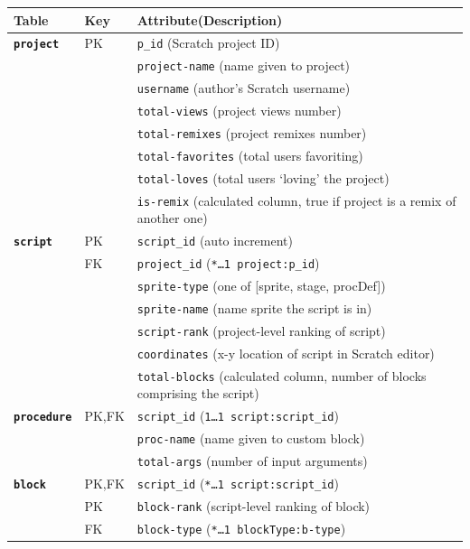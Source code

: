 \documentclass[10pt, conference]{IEEEtran}
\begin{document}
\begin{table}[ht]
	\centering
	\begin{tabular}{llp{5.4cm}}
		\textbf{Table}& \textbf{Key} & \textbf{Attribute(Description)}\\
		\hline
		\textbf{\texttt{project}} & PK & \texttt{p\_id} (Scratch project ID)\\
		&  & 							\texttt{project-name} (name given to project)\\
		&  & 							\texttt{username} (author's Scratch 
		username)\\
		&  & 							\texttt{total-views} (project views number)\\
		&  & 							\texttt{total-remixes} (project remixes number)\\
		&  & 							\texttt{total-favorites} (total users favoriting)\\
		&  & 							\texttt{total-loves} (total users `loving' the project)\\
		& & 							\texttt{is-remix} (calculated column, true if project is a remix of another one)\\
		\hline
		\textbf{\texttt{script}} & PK & \texttt{script\_id} (auto increment)\\
		& FK & 							\texttt{project\_id} (\scriptsize{\texttt{*\ldots1 project:p\_id}})\\
		& & 							\texttt{sprite-type} (one of [sprite, stage, procDef])\\
		& & 							\texttt{sprite-name} (name sprite the script is in)\\
		& & 							\texttt{script-rank} (project-level ranking of script)\\
		& & 							\texttt{coordinates} (x-y location of script in Scratch editor)\\
		& & 							\texttt{total-blocks} (calculated column, number of blocks comprising the script)\\
		\hline
		\textbf{\texttt{procedure}} & PK,FK & \texttt{script\_id} (\scriptsize{\texttt{1\ldots1 script:script\_id}})\\
		& & 							\texttt{proc-name} (name given to custom block)\\
		& & 							\texttt{total-args} (number of input arguments)\\
		\hline
		\textbf{\texttt{block}} & PK,FK  & \texttt{script\_id} (\scriptsize{\texttt{*\ldots1 script:script\_id}})\\
		& PK & \texttt{block-rank} (script-level ranking of block)\\
		& FK & \texttt{block-type} (\scriptsize{\texttt{*\ldots1 blockType:b-type}})\\

\end{tabular}
\end{table}
\end{document}
